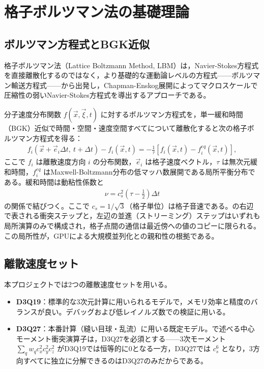 \section{格子ボルツマン法の基礎理論}
\label{sec:lbm}

\subsection{ボルツマン方程式とBGK近似}

格子ボルツマン法（Lattice Boltzmann Method, LBM）は，Navier-Stokes方程式を直接離散化するのではなく，より基礎的な運動論レベルの方程式——ボルツマン輸送方程式——から出発し，Chapman-Enskog展開によってマクロスケールで圧縮性の弱いNavier-Stokes方程式を導出するアプローチである。

分子速度分布関数 \(f(\vec x,\vec\xi,t)\) に対するボルツマン方程式を，単一緩和時間（BGK）近似で時間・空間・速度空間すべてについて離散化すると次の格子ボルツマン方程式を得る：
\begin{align}
	f_i(\vec x+\vec e_i\Delta t,\ t+\Delta t) - f_i(\vec x,t)
	= -\frac{1}{\tau}\left[f_i(\vec x,t) - f_i^{eq}(\vec x,t)\right],
	\label{eq:lbe}
\end{align}
ここで \(f_i\) は離散速度方向 \(i\) の分布関数，\(\vec e_i\) は格子速度ベクトル，\(\tau\) は無次元緩和時間，\(f_i^{eq}\) はMaxwell-Boltzmann分布の低マッハ数展開である局所平衡分布である。緩和時間は動粘性係数と
\begin{align}
	\nu = c_s^2\left(\tau - \frac{1}{2}\right)\Delta t
	\label{eq:viscosity}
\end{align}
の関係で結びつく。ここで \(c_s = 1/\sqrt3\)（格子単位）は格子音速である。の右辺で表される衝突ステップと，左辺の並進（ストリーミング）ステップはいずれも局所演算のみで構成され，格子点間の通信は最近傍への値のコピーに限られる。この局所性が，GPUによる大規模並列化との親和性の根拠である。

\subsection{離散速度セット}

本プロジェクトでは2つの離散速度セットを用いる。

\begin{itemize}
	\item \textbf{D3Q19}：標準的な3次元計算に用いられるモデルで，メモリ効率と精度のバランスが良い。デバッグおよび低レイノルズ数での検証に用いる。
	\item \textbf{D3Q27}：本番計算（縫い目球・乱流）に用いる既定モデル。で述べる中心モーメント衝突演算子は，D3Q27を必須とする——3次モーメント \(\sum_q w_q c_{x}^2c_{y}^2c_{z}^2\) がD3Q19では恒等的に0となる一方，D3Q27では \(c_s^6\) となり，3方向すべてに独立に分解できるのはD3Q27のみだからである。
\end{itemize}

